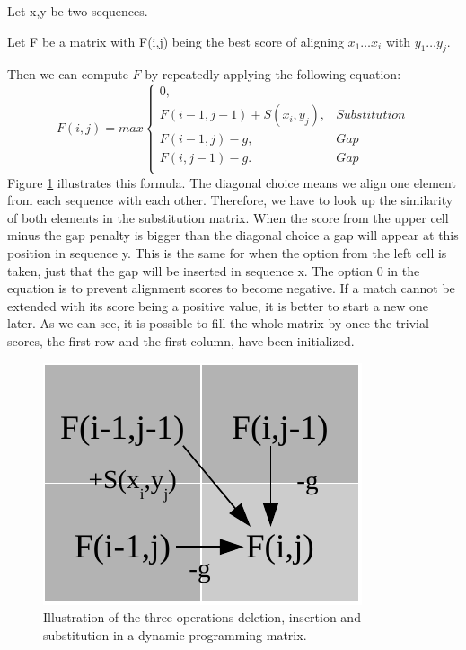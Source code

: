\begin{definition}
	\item Let x,y be two sequences.
	\item Let F be a matrix with F(i,j) being the best score of aligning $x_1\dots x_i$ with $y_1\dots y_j$.
\end{definition}
Then we can compute $F$ by repeatedly applying the following equation:
\begin{equation}
F(i,j) = max \left\{ \begin{array}{lr}0,&\\F(i-1,j-1)+S(x_i,y_j),&Substitution\\F(i-1,j)-g,&Gap\\F(i,j-1)-g.&Gap\\\end{array} \right.
\end{equation}
Figure \ref{fig:basicalignmentoperations} illustrates this formula.
The diagonal choice means we align one element from each sequence with each other.
Therefore, we have to look up the similarity of both elements in the substitution matrix.
When the score from the upper cell minus the gap penalty is bigger than the diagonal choice a gap will appear at this position in sequence y.
This is the same for when the option from the left cell is taken, just that the gap will be inserted in sequence x.
The option 0 in the equation is to prevent alignment scores to become negative.
If a match cannot be extended with its score being a positive value, it is better to start a new one later.
As we can see, it is possible to fill the whole matrix by once the trivial scores, the first row and the first column, have been initialized.

\begin{figure}
	\centering
	\includegraphics{img/basic_cell_fill.pdf}
	\caption{Illustration of the three operations deletion, insertion and substitution in a dynamic programming matrix.}
	\label{fig:basicalignmentoperations}
\end{figure}

